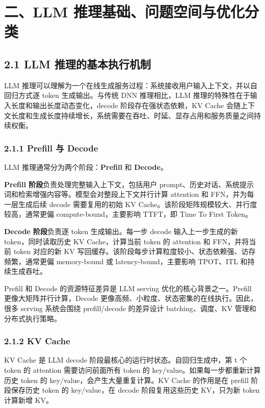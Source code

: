 \documentclass[a4paper,twocolumn,10pt]{ctexart}
\begin{document}
\section{二、LLM 推理基础、问题空间与优化分类}

\subsection{2.1 LLM 推理的基本执行机制}

LLM 推理可以理解为一个在线生成服务过程：系统接收用户输入上下文，并以自回归方式逐 token 生成输出。与传统 DNN 推理相比，LLM 推理的特殊性在于输入长度和输出长度动态变化，decode 阶段存在强状态依赖，KV Cache 会随上下文长度和生成长度持续增长，系统需要在吞吐、时延、显存占用和服务质量之间持续权衡。


\subsubsection{2.1.1 Prefill 与 Decode}

LLM 推理通常分为两个阶段：\textbf{Prefill} 和 \textbf{Decode}。


\textbf{Prefill 阶段}负责处理完整输入上下文，包括用户 prompt、历史对话、系统提示词和检索增强内容等。模型会对整段上下文并行计算 attention 和 FFN，并为每一层生成后续 decode 需要复用的初始 KV Cache。该阶段矩阵规模较大、并行度较高，通常更偏 compute-bound，主要影响 TTFT，即 Time To First Token。


\textbf{Decode 阶段}负责逐 token 生成输出。每一步 decode 输入上一步生成的新 token，同时读取历史 KV Cache，计算当前 token 的 attention 和 FFN，并将当前 token 对应的新 KV 写回缓存。该阶段每步计算粒度较小、状态依赖强、访存频繁，通常更偏 memory-bound 或 latency-bound，主要影响 TPOT、ITL 和持续生成吞吐。


Prefill 和 Decode 的资源特征差异是 LLM serving 优化的核心背景之一。Prefill 更像大矩阵并行计算，Decode 更像高频、小粒度、状态密集的在线执行。因此，很多 serving 系统会围绕 prefill/decode 的差异设计 batching、调度、KV 管理和分布式执行策略。




\subsubsection{2.1.2 KV Cache}

KV Cache 是 LLM decode 阶段最核心的运行时状态。自回归生成中，第 t 个 token 的 attention 需要访问前面所有 token 的 key/value。如果每一步都重新计算历史 token 的 key/value，会产生大量重复计算。KV Cache 的作用是在 prefill 阶段保存历史 token 的 key/value，在 decode 阶段复用这些历史 KV，只为新 token 计算新增 KV。
\end{document}
